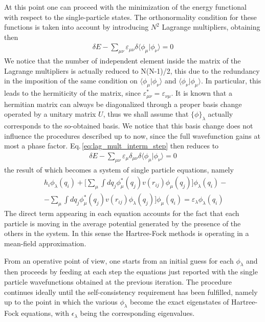 At this point one can proceed with the minimization of the energy functional with respect to the single-particle states. The orthonormality condition for these functions is taken into account by introducing $N^2$ Lagrange multipliers, obtaining then
\begin{align}
    \delta E - \sum_{\mu\nu} \varepsilon_{\mu\nu} \delta \langle \phi_\mu \vert \phi_\nu \rangle = 0
    \label{eq:lag_mult_interm_step}
\end{align}
We notice that the number of independent element inside the matrix of the Lagrange multipliers is actually reduced to N(N-1)/2, this due to the redundancy in the imposition of the same condition on $\langle \phi_\mu \vert \phi_\nu \rangle$ and $\langle \phi_\nu \vert \phi_\mu \rangle$. In particular, this leads to the hermiticity of the matrix, since $\varepsilon_{\mu\nu}^* = \varepsilon_{\nu\mu}$. It is known that a hermitian matrix can always be diagonalized through a proper basis change operated by a unitary matrix $U$, thus we shall assume that $\{\phi\}_\lambda$ actually corresponds to the so-obtained basis. We notice that this basis change does not influence the procedures described up to now, since the full wavefunction gains at most a phase factor. Eq.\,\ref{eq:lag_mult_interm_step} then reduces to
\begin{align*}
    \delta E - \sum_{\mu\nu} \varepsilon_{\mu} \delta_{\mu\nu} \delta \langle \phi_\mu \vert \phi_\nu \rangle = 0
\end{align*}
the result of which becomes a system of single particle equations, namely
\begin{align*}
    &h_i \phi_\lambda(q_i) + \bigg[ \sum_\mu \int dq_j \phi_\mu^*(q_j) v(r_{ij}) \phi_\mu(q_j) \bigg] \phi_\lambda (q_i) - \\
    & - \sum_\mu \int dq_j \phi_\mu^*(q_j) v(r_{ij}) \phi_\lambda(q_j) \bigg] \phi_\mu (q_i) = \varepsilon_\lambda \phi_\lambda (q_i)
\end{align*}
The direct term appearing in each equation accounts for the fact that each particle is moving in the average potential generated by the presence of the others in the system. In this sense the Hartree-Fock methods is operating in a mean-field approximation. 

From an operative point of view, one starts from an initial guess for each $\phi_\lambda$ and then proceeds by feeding at each step the equations just reported with the single particle wavefunctions obtained at the previous iteration. The procedure continues ideally until the self-consistency requirement has been fulfilled, namely up to the point in which the various $\phi_\lambda$ become the exact eigenstates of Hartree-Fock equations, with $\epsilon_\lambda$ being the corresponding eigenvalues. 























